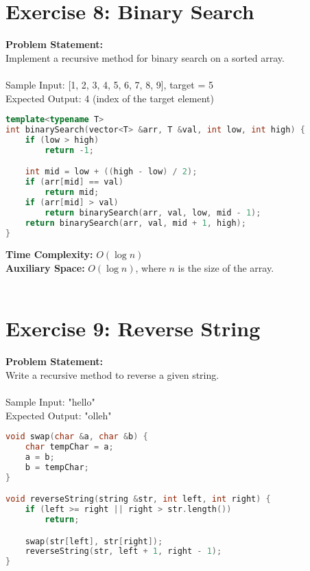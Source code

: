 \documentclass{article}
\begin{document}
\section{Exercise 8: Binary Search}
\textbf{Problem Statement:}\\
Implement a recursive method for binary search on a sorted array.\\\\
Sample Input: [1, 2, 3, 4, 5, 6, 7, 8, 9], target = 5\\
Expected Output: 4 (index of the target element)

\begin{lstlisting}[language=C++, caption={Binary Search Subprogram}, label=cppcode]
template<typename T>
int binarySearch(vector<T> &arr, T &val, int low, int high) {
    if (low > high)
        return -1;

    int mid = low + ((high - low) / 2);
    if (arr[mid] == val)
        return mid;
    if (arr[mid] > val)
        return binarySearch(arr, val, low, mid - 1);
    return binarySearch(arr, val, mid + 1, high);
}
\end{lstlisting}

\textbf{Time Complexity:} $O(\log n)$\\
\textbf{Auxiliary Space:} $O(\log n)$, where $n$ is the size of the array.\\\\

\section{Exercise 9: Reverse String}
\textbf{Problem Statement:}\\
Write a recursive method to reverse a given string.\\\\
Sample Input: "hello"\\
Expected Output: "olleh"

\begin{lstlisting}[language=C++, caption={Reverse String Procedure}, label=cppcode]
void swap(char &a, char &b) {
    char tempChar = a;
    a = b;
    b = tempChar;
}

void reverseString(string &str, int left, int right) {
    if (left >= right || right > str.length())
        return;

    swap(str[left], str[right]);
    reverseString(str, left + 1, right - 1);
}
\end{lstlisting}
\end{document}
